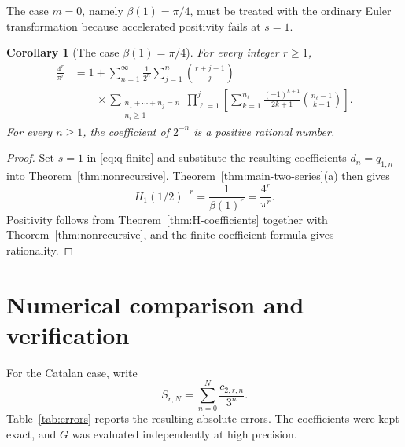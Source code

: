 \documentclass[11pt,reqno]{amsart}
\numberwithin{equation}{section}
\newtheorem{corollary}[theorem]{Corollary}
\theoremstyle{definition}
\theoremstyle{remark}
\newcommand{\Gconst}{G}
\begin{document}
The case \(m=0\), namely \(\beta(1)=\pi/4\), must be treated with
the ordinary Euler transformation because accelerated positivity fails
at \(s=1\).

\begin{corollary}[The case \(\beta(1)=\pi/4\)]
\label{cor:pi1-ordinary}
For every integer \(r\geq1\),
\begin{equation}\label{eq:pi1-ordinary}
\begin{aligned}
 \frac{4^r}{\pi^r}
 &=
 1+\sum_{n=1}^{\infty}\frac1{2^n}
 \sum_{j=1}^{n}\binom{r+j-1}{j}\\
 &\qquad {}\times
 \sum_{\substack{n_1+\cdots+n_j=n\\n_i\geq1}}
 \prod_{\ell=1}^{j}
 \left[
 \sum_{k=1}^{n_\ell}
 \frac{(-1)^{k+1}}{2k+1}
 \binom{n_\ell-1}{k-1}
 \right].
\end{aligned}
\end{equation}
For every \(n\geq1\), the coefficient of \(2^{-n}\) is a positive
rational number.
\end{corollary}

\begin{proof}
Set \(s=1\) in \eqref{eq:q-finite} and substitute the resulting
coefficients \(d_n=q_{1,n}\) into
Theorem~\ref{thm:nonrecursive}.  Theorem~\ref{thm:main-two-series}(a)
then gives
\[
 H_1(1/2)^{-r}
 =
 \frac1{\beta(1)^r}
 =
 \frac{4^r}{\pi^r}.
\]
Positivity follows from Theorem~\ref{thm:H-coefficients} together with
Theorem~\ref{thm:nonrecursive}, and the finite coefficient formula
gives rationality.
\end{proof}
\section{Numerical comparison and verification}\label{sec:numerics}

For the Catalan case, write
\begin{equation}\label{eq:S-rN}
 S_{r,N}=\sum_{n=0}^{N}\frac{c_{2,r,n}}{3^n}.
\end{equation}
Table~\ref{tab:errors} reports the resulting absolute errors.  The
coefficients were kept exact, and \(\Gconst\) was evaluated
independently at high precision.
\end{document}
